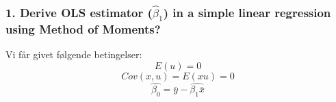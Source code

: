 \documentclass[
  10pt,
]{article}
\begin{document}


\hypertarget{derive-ols-estimator-hatbeta_1-in-a-simple-linear-regression-using-method-of-moments}{%
\subsubsection{\texorpdfstring{1. Derive OLS estimator
(\(\hat{\beta}_1\)) in a simple linear regression using Method of
Moments?}{1. Derive OLS estimator (\textbackslash hat\{\textbackslash beta\}\_1) in a simple linear regression using Method of Moments?}}\label{derive-ols-estimator-hatbeta_1-in-a-simple-linear-regression-using-method-of-moments}}

\leavevmode

Vi får givet følgende betingelser: \[ E(u)=0\] \[ Cov(x,u)=E(xu)=0\]
\[ \hat{\beta_0} = \bar{y}-\hat{\beta_1\bar{x}} \]
\end{document}
